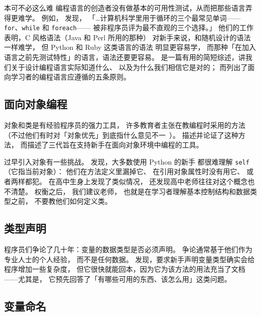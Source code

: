 \begin{aside}{本可不必这么难}
  编程语言的创造者没有做基本的可用性测试，从而把那些语言弄得更难学。
  例如，
  \cite{Stef2013}发现，
  「{\ldots}计算机科学里用于循环的三个最常见单词——
  \texttt{for}、\texttt{while} 和 \texttt{foreach}——
  被非程序员评为最不直观的三个选择。」
  他们的工作表明，C 风格语法（Java 和 Perl 所用的那种）
  对新手来说，和随机设计的语法一样难学，
  但 Python 和 Ruby 这类语言的语法
  明显更容易学，
  而那种「在加入语言之前先测试特性」的语言，语法还要更容易。
  \cite{Stef2017}是一篇有用的简短综述，讲我们关于设计编程语言实际知道什么、
  以及为什么我们相信它是对的；
  而\cite{Guzd2016}列出了面向学习者的编程语言应遵循的五条原则。
\end{aside}

\subsection*{面向对象编程}

对象和类是有经验程序员的强力工具，
许多教育者主张在教编程时采用的方法
（不过他们有时对「对象优先」到底指什么意见不一~\cite{Benn2007b}）。
\cite{Sorv2014}描述并论证了这种方法，
而\cite{Koll2015}描述了三代旨在支持新手在面向对象环境中编程的工具。

过早引入对象有一些挑战。
\cite{Mill2016b}发现，大多数使用 Python 的新手
都很难理解 \texttt{self}
（它指当前对象）：
他们在方法定义里漏掉它、
在引用对象属性时没有用它、
或者两样都犯。
\cite{Rago2017}在高中生身上发现了类似情况，
还发现高中老师往往对这个概念也不清楚。
权衡之后，
我们建议老师，
也就是在学习者理解基本控制结构和数据类型之前，
不要教他们如何定义类。

\subsection*{类型声明}

程序员们争论了几十年：变量的数据类型是否必须声明。
争论通常基于他们作为专业人士的个人经验，
而不是任何数据。
\cite{Endr2014,Fisc2015}发现，要求新手声明变量类型确实会给程序增加一些复杂度，
但它很快就能回本，因为它为该方法的用法充当了文档——尤其是，
它预先回答了「有哪些可用的东西、该怎么用」这类问题。

\subsection*{变量命名}

